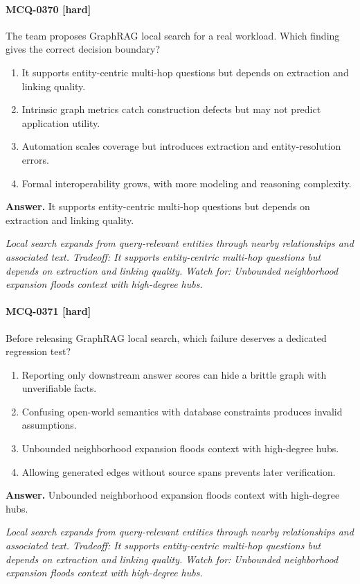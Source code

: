 \paragraph{MCQ-0370 [hard]} The team proposes GraphRAG local search for a real workload. Which finding gives the correct decision boundary?
\begin{enumerate}[label=\Alph*.]
\item It supports entity-centric multi-hop questions but depends on extraction and linking quality.
\item Intrinsic graph metrics catch construction defects but may not predict application utility.
\item Automation scales coverage but introduces extraction and entity-resolution errors.
\item Formal interoperability grows, with more modeling and reasoning complexity.
\end{enumerate}
\noindent\textbf{Answer.} It supports entity-centric multi-hop questions but depends on extraction and linking quality.
\par\textit{Local search expands from query-relevant entities through nearby relationships and associated text. Tradeoff: It supports entity-centric multi-hop questions but depends on extraction and linking quality. Watch for: Unbounded neighborhood expansion floods context with high-degree hubs.}
\paragraph{MCQ-0371 [hard]} Before releasing GraphRAG local search, which failure deserves a dedicated regression test?
\begin{enumerate}[label=\Alph*.]
\item Reporting only downstream answer scores can hide a brittle graph with unverifiable facts.
\item Confusing open-world semantics with database constraints produces invalid assumptions.
\item Unbounded neighborhood expansion floods context with high-degree hubs.
\item Allowing generated edges without source spans prevents later verification.
\end{enumerate}
\noindent\textbf{Answer.} Unbounded neighborhood expansion floods context with high-degree hubs.
\par\textit{Local search expands from query-relevant entities through nearby relationships and associated text. Tradeoff: It supports entity-centric multi-hop questions but depends on extraction and linking quality. Watch for: Unbounded neighborhood expansion floods context with high-degree hubs.}
